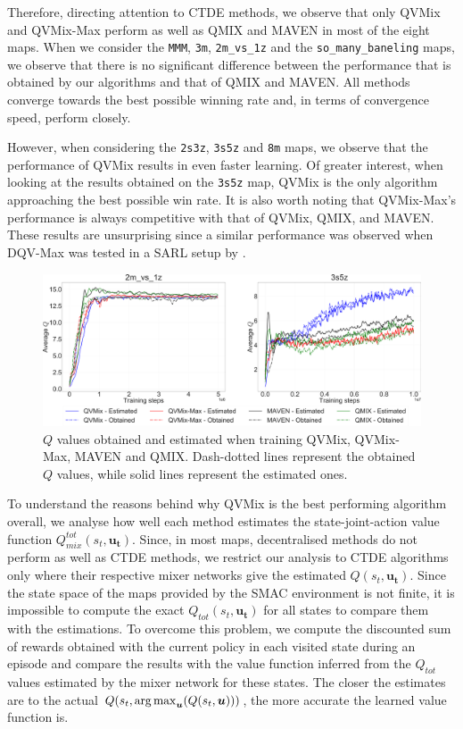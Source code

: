 Therefore, directing attention to CTDE methods, we observe that only QVMix and QVMix-Max perform as well as QMIX and MAVEN in most of the eight maps.
When we consider the \texttt{MMM}, \texttt{3m}, \texttt{2m\_vs\_1z} and the \texttt{so\_many\_baneling} maps, we observe that there is no significant difference between the performance that is obtained by our algorithms and that of QMIX and MAVEN. 
All methods converge towards the best possible winning rate and, in terms of convergence speed, perform closely.

However, when considering the \texttt{2s3z}, \texttt{3s5z} and \texttt{8m} maps, we observe that the performance of QVMix results in even faster learning. 
Of greater interest, when looking at the results obtained on the \texttt{3s5z} map, QVMix is the only algorithm approaching the best possible win rate.
It is also worth noting that QVMix-Max's performance is always competitive with that of QVMix, QMIX, and MAVEN.
These results are unsurprising since a similar performance was observed when DQV-Max was tested in a SARL setup by \cite{sabatelli2020deep}.

\begin{figure}
\centering
\includegraphics[width=.95\linewidth]{tex_thesis/figures/ch4/2m1z3s5zQ.pdf}
\caption{$Q$ values obtained and estimated when training QVMix, QVMix-Max, MAVEN and QMIX. Dash-dotted lines represent the obtained $Q$ values, while solid lines represent the estimated ones.}
\label{fig:exp_plots_overestim:q_best_worse}
\end{figure}

To understand the reasons behind why QVMix is the best performing algorithm overall, we analyse how well each method estimates the state-joint-action value function $Q_{mix}^{tot}(s_t, \mathbf{u_t})$. 
Since, in most maps, decentralised methods do not perform as well as CTDE methods, we restrict our analysis to CTDE algorithms only where their respective mixer networks give the estimated $Q(s_t, \mathbf{u_t})$.
Since the state space of the maps provided by the SMAC environment is not finite, it is impossible to compute the exact $Q_{tot}(s_t, \mathbf{u_t})$ for all states to compare them with the estimations.
To overcome this problem, we compute the discounted sum of rewards obtained with the current policy in each visited state during an episode and compare the results with the value function inferred from the $Q_{tot}$ values estimated by the mixer network for these states.
The closer the estimates are to the actual $Q(s_t, \argmax_{\mathbf{u}}(Q(s_t,\mathbf{u})))$, the more accurate the learned value function is.


